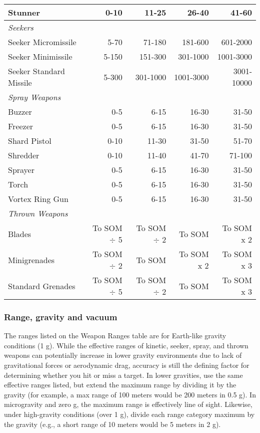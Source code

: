 \begin{table}
\begin{tabular}{|l|r|r|r|r|}
\hline Stunner				& 0-10	& 11-25	& 26-40	& 41-60 \\
\hline \multicolumn{5}{|l|}{\emph{Seekers}} \\
\hline Seeker Micromissile		& 5-70	& 71-180		& 181-600		& 601-2000 \\
\hline Seeker Minimissile		& 5-150	& 151-300		& 301-1000	& 1001-3000 \\
\hline Seeker Standard Missile	& 5-300	& 301-1000	& 1001-3000	& 3001-10000 \\
\hline \multicolumn{5}{|l|}{\emph{Spray Weapons}} \\
\hline Buzzer			& 0-5	& 6-15	& 16-30	& 31-50\\
\hline Freezer			& 0-5	& 6-15	& 16-30	& 31-50\\
\hline Shard Pistol		& 0-10	& 11-30	& 31-50	& 51-70\\
\hline Shredder		& 0-10	& 11-40	& 41-70	& 71-100\\
\hline Sprayer			& 0-5	& 6-15	& 16-30	& 31-50\\
\hline Torch			& 0-5	& 6-15	& 16-30	& 31-50\\
\hline Vortex Ring Gun	& 0-5	& 6-15	& 16-30	& 31-50\\
\hline \multicolumn{5}{|l|}{\emph{Thrown Weapons}} \\
\hline Blades 			& To SOM $\div$ 5 	& To SOM $\div$ 2 	& To SOM 		& To SOM x 2 \\
\hline Minigrenades 	& To SOM $\div$ 2 	& To SOM 			& To SOM x 2 	& To SOM x 3 \\
\hline Standard Grenades & To SOM $\div$ 5 	& To SOM $\div$ 2 	& To SOM 		& To SOM x 3 \\
\hline
\end{tabular}
\end{table}


\subsubsection{Range, gravity and vacuum}

The ranges listed on the Weapon Ranges table are for Earth-like gravity conditions (1 g). While the effective ranges of kinetic, seeker, spray, and thrown weapons can potentially increase in lower gravity environments due to lack of gravitational forces or aerodynamic drag, accuracy is still the defining factor for determining whether you hit or miss a target. In lower gravities, use the same effective ranges listed, but extend the maximum range by dividing it by the gravity (for example, a max range of 100 meters would be 200 meters in 0.5 g). In microgravity and zero g, the maximum range is effectively line of sight. Likewise, under high-gravity conditions (over 1 g), divide each range category maximum by the gravity (e.g., a short range of 10 meters would be 5 meters in 2 g).


